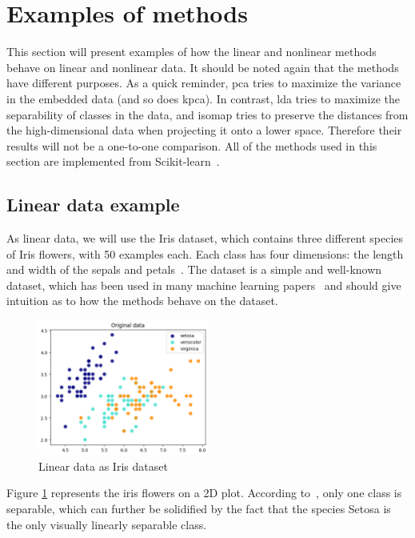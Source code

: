 \section{Examples of methods}\label{sec:examples-methods}
This section will present examples of how the linear and nonlinear methods behave on linear and nonlinear data. It should be noted again that the methods have different purposes. As a quick reminder, \gls{pca} tries to maximize the variance in the embedded data (and so does \gls{kpca}). In contrast, \gls{lda} tries to maximize the separability of classes in the data, and \gls{isomap} tries to preserve the distances from the high-dimensional data when projecting it onto a lower space. Therefore their results will not be a one-to-one comparison. All of the methods used in this section are implemented from Scikit-learn~\cite{scikit-learn}.

\subsection{Linear data example}\label{subsec:linear-data-example}
As linear data, we will use the Iris dataset, which contains three different species of Iris flowers, with 50 examples each. Each class has four dimensions: the length and width of the sepals and petals~\cite{iris-dataset}. The dataset is a simple and well-known dataset, which has been used in many machine learning papers~\cite{iris-dataset} and should give intuition as to how the methods behave on the dataset.

\begin{figure}[htb!]
    \centering
    \includegraphics[width=0.5\textwidth]{figures/theory-example-figures/linear-data.png}
    \caption{Linear data as Iris dataset}
    \label{fig:linear-data}
\end{figure}

Figure \ref{fig:linear-data} represents the iris flowers on a 2D plot. According to~\cite{iris-dataset}, only one class is separable, which can further be solidified by the fact that the species Setosa is the only visually linearly separable class. 

